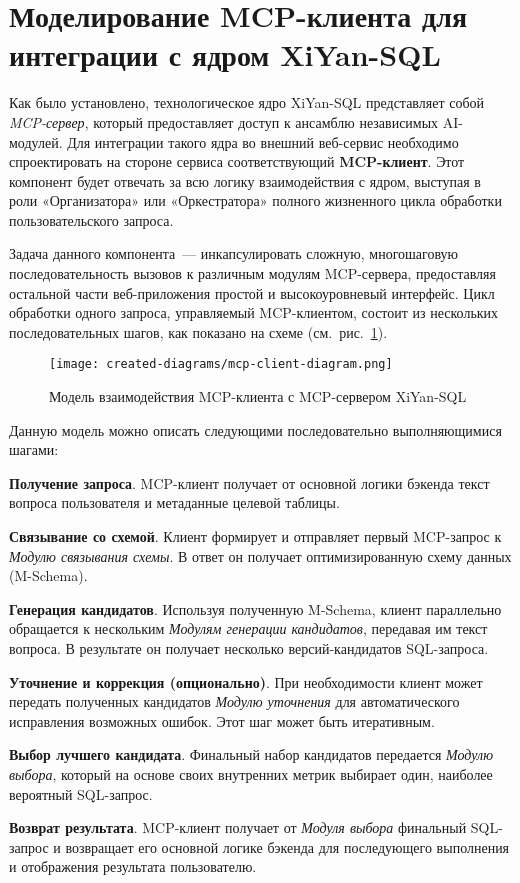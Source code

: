 \section{Моделирование MCP-клиента для интеграции с ядром XiYan-SQL}

Как было установлено, технологическое ядро XiYan-SQL представляет собой \textit{MCP-сервер},
который предоставляет доступ к ансамблю независимых AI-модулей. Для интеграции такого ядра во
внешний веб-сервис необходимо спроектировать на стороне сервиса соответствующий \textbf{MCP-клиент}.
Этот компонент будет отвечать за всю логику взаимодействия с ядром,
выступая в роли «Организатора» или «Оркестратора» полного жизненного цикла обработки
пользовательского запроса.

Задача данного компонента~--- инкапсулировать сложную, многошаговую последовательность
вызовов к различным модулям MCP-сервера, предоставляя остальной части веб-приложения
простой и высокоуровневый интерфейс. Цикл обработки одного запроса, управляемый MCP-клиентом,
состоит из нескольких последовательных шагов, как показано на схеме
(см.~рис.~\ref{fig:mcp-client-flow}).

\begin{figure}[ht]
	\centering
	\texttt{[image: created-diagrams/mcp-client-diagram.png]}
	\caption{Модель взаимодействия MCP-клиента с MCP-сервером XiYan-SQL}
	\label{fig:mcp-client-flow}
\end{figure}

Данную модель можно описать следующими последовательно выполняющимися шагами:
\begin{compactenum}
	\item \textbf{Получение запроса}. MCP-клиент получает от основной логики бэкенда
	текст вопроса пользователя и метаданные целевой таблицы.
	\item \textbf{Связывание со схемой}. Клиент формирует и отправляет
	первый MCP-запрос к \textit{Модулю связывания схемы}. В ответ он получает
	оптимизированную схему данных (M-Schema).
	\item \textbf{Генерация кандидатов}. Используя полученную M-Schema,
	клиент параллельно обращается к нескольким \textit{Модулям генерации кандидатов},
	передавая им текст вопроса. В результате он получает несколько версий-кандидатов SQL-запроса.
	\item \textbf{Уточнение и коррекция (опционально)}. При необходимости клиент может
	передать полученных кандидатов \textit{Модулю уточнения} для автоматического
	исправления возможных ошибок. Этот шаг может быть итеративным.
	\item \textbf{Выбор лучшего кандидата}. Финальный набор кандидатов передается
	\textit{Модулю выбора}, который на основе своих внутренних метрик выбирает один,
	наиболее вероятный SQL-запрос.
	\item \textbf{Возврат результата}. MCP-клиент получает от \textit{Модуля выбора}
	финальный SQL-запрос и возвращает его основной логике бэкенда для последующего выполнения и
	отображения результата пользователю.
\end{compactenum}

